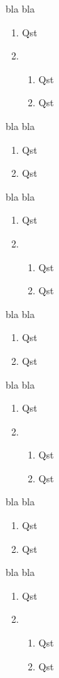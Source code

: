 \documentclass[12pt,a4paper]{report}
\newcommand{\be}{\begin{enumerate}}
\newcommand{\ee}{\end{enumerate}}
\begin{document}
\begin{multicols*}{2}
\begin{boxx}
bla bla
\be 
\item Qst
\item \be 
\item Qst
\item Qst
\ee
\ee
\end{boxx}
\begin{boxx}
bla bla
 \be 
 \item Qst
 \item Qst
 \ee
\end{boxx}
\begin{boxx}
 bla bla
 \be 
 \item Qst
 \item \be 
 \item Qst
 \item Qst
 \ee
 \ee
\end{boxx}
\begin{boxx}
 bla bla
 \be 
 \item Qst
 \item Qst
 \ee
\end{boxx}
\begin{boxx}
 bla bla
 \be 
 \item Qst
 \item \be 
 \item Qst
 \item Qst
 \ee
 \ee
\end{boxx}
\begin{boxx}
 bla bla
 \be 
 \item Qst
 \item Qst
 \ee
\end{boxx}
\begin{boxx}
 bla bla
 \be 
 \item Qst
 \item \be 
 \item Qst
 \item Qst
 \ee
 \ee
\end{boxx}
\end{multicols*}
\end{document}
